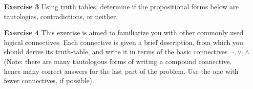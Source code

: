 \documentclass[12pt,oneside]{exam}
\newenvironment{exercise}[1]{\vspace{.1in}\noindent\textbf{Exercise #1 \hspace{.05em}}}{}
\begin{document}
\begin{exercise}{3}
Using truth tables, determine if the propositional forms below are tautologies, contradictions, or neither.
\end{exercise}

\begin{exercise}{4}
This exercise is aimed to familiarize you with other commonly used logical connectives. Each connective is given a brief description, from which you should derive its truth-table, and write it in terms of the basic connectives $\neg, \lor, \land$ (Note: there are many tautologous forms of writing a compound connective, hence many correct answers for the last part of the problem. Use the one with fewer connectives, if possible). 
\end{exercise}
\end{document}
